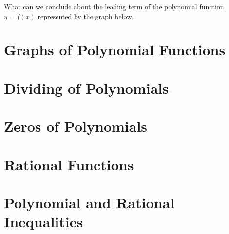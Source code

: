 \begin{example}
  What can we conclude about the leading term of the polynomial function $y=f(x)$ represented by the graph below.\\
\end{example}
\vspace*{-0.4\textheight}


\newpage
\section{Graphs of Polynomial Functions}

\section{Dividing of Polynomials}

\section{Zeros of Polynomials}

\section{Rational Functions}

\section{Polynomial and Rational Inequalities}



